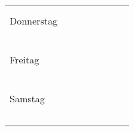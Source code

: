 \documentclass[a4paper]{article}
\begin{document}
\begin{tabular}{lc||c|c|c||c|c|c}
             &         &       &        &          &         &       &      \\
             &         &       &        &          &         &       &      \\
  \midrule
  Donnerstag &         &       &        &          &         &       &      \\
             &         &       &        &          &         &       &      \\
             &         &       &        &          &         &       &      \\
             &         &       &        &          &         &       &      \\
             &         &       &        &          &         &       &      \\
             &         &       &        &          &         &       &      \\
             &         &       &        &          &         &       &      \\
  \midrule
  Freitag    &         &       &        &          &         &       &      \\
             &         &       &        &          &         &       &      \\
             &         &       &        &          &         &       &      \\
             &         &       &        &          &         &       &      \\
             &         &       &        &          &         &       &      \\
             &         &       &        &          &         &       &      \\
             &         &       &        &          &         &       &      \\
  \midrule
  Samstag    &         &       &        &          &         &       &      \\
             &         &       &        &          &         &       &      \\
             &         &       &        &          &         &       &      \\
             &         &       &        &          &         &       &      \\
             &         &       &        &          &         &       &      \\
             &         &       &        &          &         &       &      \\

\end{tabular}
\end{document}
